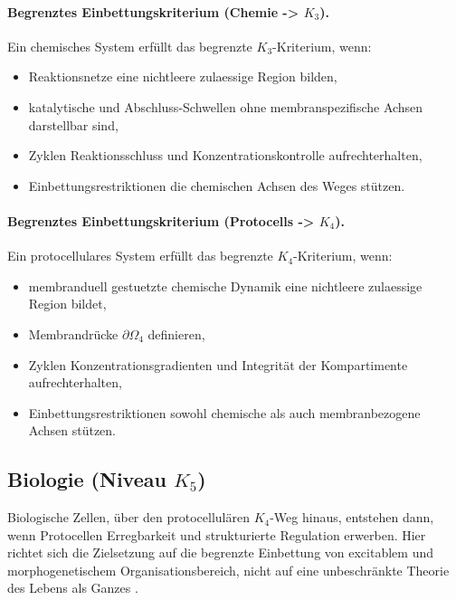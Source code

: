 \paragraph{Begrenztes Einbettungskriterium (Chemie -> \texorpdfstring{\(K_3\)}{K3}).}
Ein chemisches System erfüllt das begrenzte \(K_3\)-Kriterium, wenn:
\begin{itemize}
  \item Reaktionsnetze eine nichtleere zulaessige Region bilden,
  \item katalytische und Abschluss-Schwellen ohne membranspezifische Achsen
        darstellbar sind,
  \item Zyklen Reaktionsschluss und Konzentrationskontrolle aufrechterhalten,
  \item Einbettungsrestriktionen die chemischen Achsen des Weges stützen.
\end{itemize}

\paragraph{Begrenztes Einbettungskriterium (Protocells -> \texorpdfstring{\(K_4\)}{K4}).}
Ein protocellulares System erfüllt das begrenzte \(K_4\)-Kriterium, wenn:
\begin{itemize}
  \item membranduell gestuetzte chemische Dynamik eine nichtleere zulaessige
        Region bildet,
  \item Membrandrücke \(\partial\Omega_4\) definieren,
  \item Zyklen Konzentrationsgradienten und Integrität der Kompartimente
        aufrechterhalten,
  \item Einbettungsrestriktionen sowohl chemische als auch membranbezogene
        Achsen stützen.
\end{itemize}

\subsection{Biologie (Niveau \texorpdfstring{$K_5$}{K5})}

Biologische Zellen, über den protocellulären \(K_4\)-Weg hinaus, entstehen dann,
wenn Protocellen Erregbarkeit und strukturierte Regulation erwerben.
Hier richtet sich die Zielsetzung auf die begrenzte Einbettung von excitablem und
morphogenetischem Organisationsbereich, nicht auf eine unbeschränkte Theorie des
Lebens als Ganzes \parencite{turing_morphogenesis,hopfield_nn}.

